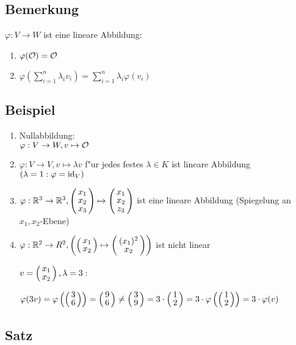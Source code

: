 \subsection{Bemerkung}
$\varphi: V \rightarrow W$ ist eine lineare Abbildung:
\begin{enumerate}
	\item
	$\varphi( \mathcal{O}) = \mathcal{O}$
	\item
	$\varphi \left(\sum_{i=1}^{n} \lambda_i v_i \right) = \sum_{i=1}^{n} \lambda_i \varphi(v_i)$ 
\end{enumerate}
\subsection{Beispiel}
\begin{enumerate}
	\item
	Nullabbildung:\\
	$\varphi: V \rightarrow W, v \mapsto \mathcal{O}$
	\item
	$\varphi : V \rightarrow V, v \mapsto \lambda v$ f"ur jedes festes $\lambda \in K$ ist lineare Abbildung $(\lambda = 1: \varphi = \mathrm{ id }_V )$
	\item
	$\varphi : \R^3 \rightarrow \R^3, \vct{x_1\\ x_2\\ x_3}\mapsto \vct{x_1 \\ x_2 \\ z_3}$ ist eine lineare Abbildung (Spiegelung an $x_1, x_2$-Ebene) 
	\item
	$\varphi : \R^ 2 \rightarrow R^2, \left(	\vct{x_1 \\ x_2} \mapsto \vct{(x_1)^2 \\ x_2 }\right)$ ist nicht linear
	
	$v= \vct{x_1 \\ x_2}, \lambda =3:$
	
	 $\varphi(3v)= \varphi\left(\vct{3 \\ 6}\right)=  \vct{9 \\ 6} \neq \vct{3 \\ 9} = 3 \cdot \vct{1\\2}= 3 \cdot \varphi \left(\vct{1\\2} \right) = 3 \cdot \varphi(v)$
	 \\

\end{enumerate}

\subsection{Satz}
\label{linAbb}

